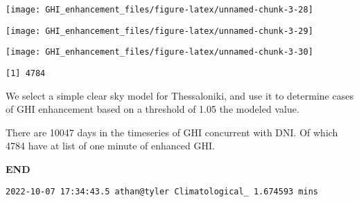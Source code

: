 \documentclass[
  11pt,
  a4paper,oneside]{article}
\begin{document}
\begin{center}\texttt{[image: GHI\_enhancement\_files/figure-latex/unnamed-chunk-3-28]} \end{center}

\begin{center}\texttt{[image: GHI\_enhancement\_files/figure-latex/unnamed-chunk-3-29]} \end{center}

\begin{center}\texttt{[image: GHI\_enhancement\_files/figure-latex/unnamed-chunk-3-30]} \end{center}

\begin{verbatim}
[1] 4784
\end{verbatim}

We select a simple clear sky model for Thessaloniki, and use it to determine
cases of GHI enhancement based on a threshold of 1.05 the modeled value.

There are 10047 days in the timeseries of GHI
concurrent with DNI. Of which 4784 have at list of one
minute of enhanced GHI.

\textbf{END}

\begin{verbatim}
2022-10-07 17:34:43.5 athan@tyler Climatological_ 1.674593 mins
\end{verbatim}
\end{document}
